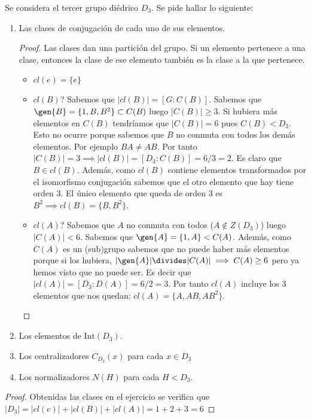 \begin{ex}[H2.1]
	\label{ex:h2.1}
	Se considera el tercer grupo diédrico $D_3$. Se pide hallar lo siguiente:
	\begin{enumerate}
		\item Las clases de conjugación de cada uno de sus elementos.
		\begin{proof}
			Las clases dan una partición del grupo. Si un elemento pertenece a una clase, entonces la clase de ese elemento también es la clase a la que pertenece.
			\begin{itemize}
				\item $cl(e) = \{e\}$
				\item $cl(B)$? Sabemos que $|cl(B)| = [G:C(B)]$. Sabemos que $\gen{B} =\{1, B, B^2\} \subset C(B)$ luego $|C(B)| \geq 3$. Si hubiera más elementos en $C(B)$ tendríamos que $|C(B)| = 6$ pues $C(B) < D_3$. Esto no ocurre porque sabemos que $B$ no conmuta con todos los demás elementos. Por ejemplo $BA \neq AB$. Por tanto $|C(B)| = 3 \implies |cl(B)| = [D_3:C(B)]= 6/3 = 2$. Es claro que $B \in cl(B)$. Además, como $cl(B)$ contiene elementos transformados por el isomorfismo conjugación sabemos que el otro elemento que hay tiene orden 3. El único elemento que queda de orden 3 es $B^2 \implies cl(B) = \{B, B^2\}$.
				
				\item $cl(A)?$ Sabemos que $A$ no conmuta con todos ($A \not\in Z(D_3)$) luego $|C(A)| < 6$. Sabemos que $\gen{A} = \{1, A\} < C(A)$. Además, como $C(A)$ es un (sub)grupo sabemos que no puede haber más elementos porque si los hubiera, $|\gen{A}| \divides |C(A)| \implies C(A) \geq 6$ pero ya hemos visto que no puede ser. Es decir que $|cl(A)| = [D_3:D(A)] = 6 / 2 = 3$. Por tanto $cl(A)$ incluye los 3 elementos que nos quedan: $cl(A) = \{A, AB, AB^2\}$.
			\end{itemize}
		\end{proof}
	
		\item Los elementos de $\text{Int}(D_3)$.
		\item Los centralizadores $C_{D_3}(x)$ para cada $x \in D_3$
		\item Los normalizadores $N(H)$ para cada $H < D_3$.
	\end{enumerate}
\end{ex}

\begin{ex}[H2.2]
	
	\begin{proof}
		Obtenidas las clases en el ejercicio  se verifica que $|D_3| = |cl(e)| + |cl(B)| + |cl(A)| = 1 + 2 + 3 = 6$
	\end{proof}
	
\end{ex}

